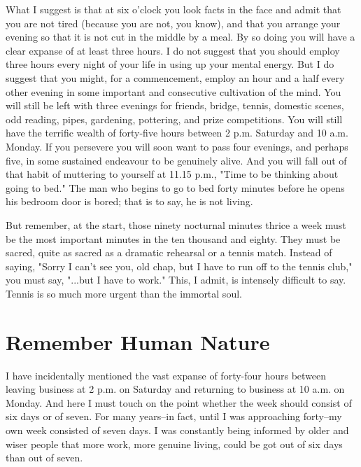 What I suggest is that at six o'clock you look facts in the face and
admit that you are not tired (because you are not, you know), and that
you arrange your evening so that it is not cut in the middle by a meal.
By so doing you will have a clear expanse of at least three hours.  I
do not suggest that you should employ three hours every night of your
life in using up your mental energy. But I do suggest that you might,
for a commencement, employ an hour and a half every other evening in
some important and consecutive cultivation of the mind.  You will still
be left with three evenings for friends, bridge, tennis, domestic
scenes, odd reading, pipes, gardening, pottering, and prize
competitions.  You will still have the terrific wealth of forty-five
hours between 2 p.m. Saturday and 10 a.m. Monday.  If you persevere you
will soon want to pass four evenings, and perhaps five, in some
sustained endeavour to be genuinely alive. And you will fall out of
that habit of muttering to yourself at 11.15 p.m., "Time to be thinking
about going to bed."  The man who begins to go to bed forty minutes
before he opens his bedroom door is bored; that is to say, he is not
living.

But remember, at the start, those ninety nocturnal minutes thrice a
week must be the most important minutes in the ten thousand and eighty.
They must be sacred, quite as sacred as a dramatic rehearsal or a
tennis match. Instead of saying, "Sorry I can't see you, old chap, but
I have to run off to the tennis club," you must say, "...but I have to
work."  This, I admit, is intensely difficult to say.  Tennis is so
much more urgent than the immortal soul.



\addtocounter{chapter}{1}\chapter*{Remember Human Nature}

I have incidentally mentioned the vast expanse of forty-four hours
between leaving business at 2 p.m. on Saturday and returning to
business at 10 a.m. on Monday.  And here I must touch on the point
whether the week should consist of six days or of seven.  For many
years--in fact, until I was approaching forty--my own week consisted of
seven days.  I was constantly being informed by older and wiser people
that more work, more genuine living, could be got out of six days than
out of seven.

